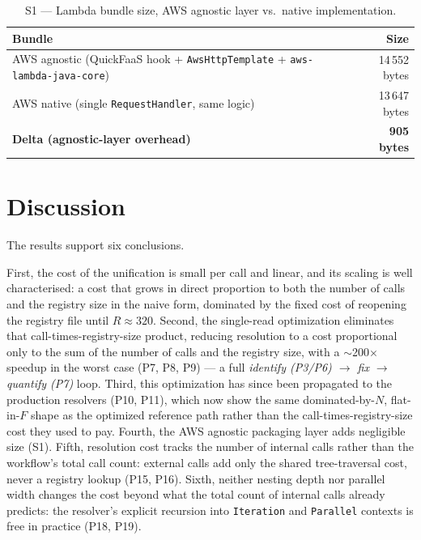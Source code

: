 \begin{table}[htbp]
  \centering
  \caption{S1 --- Lambda bundle size, AWS agnostic layer vs.\ native implementation.}
  \label{tab:eval-s1}
  \begin{tabular}{lr}
    \hline
    \textbf{Bundle} & \textbf{Size} \\
    \hline
    AWS agnostic (QuickFaaS hook + \texttt{AwsHttpTemplate} + \texttt{aws-lambda-java-core}) & 14\,552 bytes \\
    AWS native (single \texttt{RequestHandler}, same logic) & 13\,647 bytes \\
    \textbf{Delta (agnostic-layer overhead)} & \textbf{905 bytes} \\
    \hline
  \end{tabular}
\end{table}

\section{Discussion}
\label{sec:eval-discussion}

The results support six conclusions.

First, the cost of the unification is small per call and linear, and its scaling is well
characterised: a cost that grows in direct proportion to both the number of calls and the
registry size in the naive form, dominated by the fixed cost of reopening the
registry file until $R \approx 320$. Second, the single-read optimization eliminates that
call-times-registry-size product, reducing resolution to a cost proportional only to the sum of
the number of calls and the registry size, with a $\sim$200$\times$ speedup in the worst case
(P7, P8, P9) --- a full \emph{identify (P3/P6) $\rightarrow$ fix $\rightarrow$ quantify (P7)} loop.
Third, this optimization has since been propagated to the production resolvers (P10, P11), which
now show the same dominated-by-$N$, flat-in-$F$ shape as the optimized reference path rather than
the call-times-registry-size cost they used to pay.
Fourth, the AWS agnostic packaging layer adds negligible size (S1). Fifth, resolution cost tracks
the number of internal calls rather than the workflow's total call count: external calls add only
the shared tree-traversal cost, never a registry lookup (P15, P16). Sixth, neither nesting depth
nor parallel width changes the cost beyond what the total count of internal calls already
predicts: the resolver's explicit recursion into \texttt{Iteration} and \texttt{Parallel} contexts
is free in practice (P18, P19).


